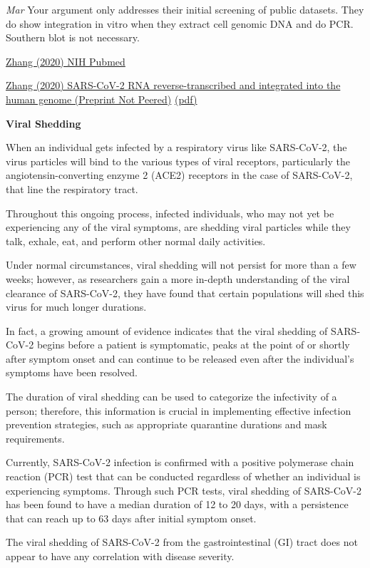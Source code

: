 \documentclass[
]{book}
\begin{document}
\emph{Mar}
Your argument only addresses their initial screening of public datasets. They do show integration in vitro when they extract cell genomic DNA and do PCR. Southern blot is not necessary.

\href{https://pubmed.ncbi.nlm.nih.gov/33330870/}{Zhang (2020) NIH Pubmed}

\href{https://www.biorxiv.org/content/10.1101/2020.12.12.422516v1}{Zhang (2020) SARS-CoV-2 RNA reverse-transcribed and integrated into the human genome (Preprint Not Peered)}
\href{pdf/Zhang_2020_SARS-CoV-2_RNA_RT.pdf}{(pdf)}

\textbf{Viral Shedding}

When an individual gets infected by a respiratory virus like SARS-CoV-2, the virus particles will bind to the various types of viral receptors, particularly the angiotensin-converting enzyme 2 (ACE2) receptors in the case of SARS-CoV-2, that line the respiratory tract.

Throughout this ongoing process, infected individuals, who may not yet be experiencing any of the viral symptoms, are shedding viral particles while they talk, exhale, eat, and perform other normal daily activities.

Under normal circumstances, viral shedding will not persist for more than a few weeks; however, as researchers gain a more in-depth understanding of the viral clearance of SARS-CoV-2, they have found that certain populations will shed this virus for much longer durations.

In fact, a growing amount of evidence indicates that the viral shedding of SARS-CoV-2 begins before a patient is symptomatic, peaks at the point of or shortly after symptom onset and can continue to be released even after the individual's symptoms have been resolved.

The duration of viral shedding can be used to categorize the infectivity of a person; therefore, this information is crucial in implementing effective infection prevention strategies, such as appropriate quarantine durations and mask requirements.

Currently, SARS-CoV-2 infection is confirmed with a positive polymerase chain reaction (PCR) test that can be conducted regardless of whether an individual is experiencing symptoms. Through such PCR tests, viral shedding of SARS-CoV-2 has been found to have a median duration of 12 to 20 days, with a persistence that can reach up to 63 days after initial symptom onset.

The viral shedding of SARS-CoV-2 from the gastrointestinal (GI) tract does not appear to have any correlation with disease severity.
\end{document}
